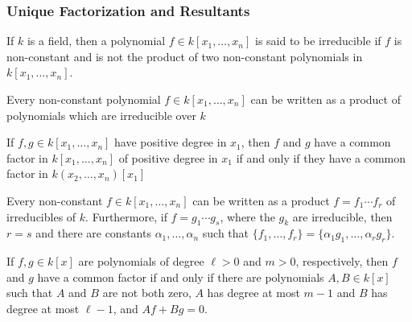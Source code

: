 \documentclass[crop=false,class=book,oneside]{standalone}
\begin{document}
            \subsubsection{Unique Factorization and Resultants}
                \begin{definition}
                If $k$ is a field, then a polynomial $f\in k[x_1,\hdots ,x_n]$ is said to be irreducible if $f$ is non-constant and is not the product of two non-constant polynomials in $k[x_1,\hdots ,x_n]$.
                \end{definition}
                \begin{theorem}
                Every non-constant polynomial $f\in k[x_1,\hdots ,x_n]$ can be written as a product of polynomials which are irreducible over $k$
                \end{theorem}
                \begin{theorem}
                If $f,g\in k[x_1,\hdots ,x_n]$ have positive degree in $x_1$, then $f$ and $g$ have a common factor in $k[x_1,\hdots ,x_n]$ of positive degree in $x_1$ if and only if they have a common factor in $k(x_2,\hdots, x_n)[x_1]$
                \end{theorem}
                \begin{theorem}
                Every non-constant $f\in k[x_1,\hdots ,x_n]$ can be written as a product $f = f_1\cdots f_r$ of irreducibles of $k$. Furthermore, if $f = g_1\cdots g_s$, where the $g_k$ are irreducible, then $r=s$ and there are constants $\alpha_1,\hdots, \alpha_n$ such that $\{f_1,\hdots, f_r\} = \{\alpha_1 g_1, \hdots, \alpha_r g_r\}$.
                \end{theorem}
                \begin{theorem}
                If $f,g \in k[x]$ are polynomials of degree $\ell>0$ and $m>0$, respectively, then $f$ and $g$ have a common factor if and only if there are polynomials $A,B\in k[x]$ such that $A$ and $B$ are not both zero, $A$ has degree at most $m-1$ and $B$ has degree at most $\ell-1$, and $Af+Bg = 0$.
                \end{theorem}
\end{document}
